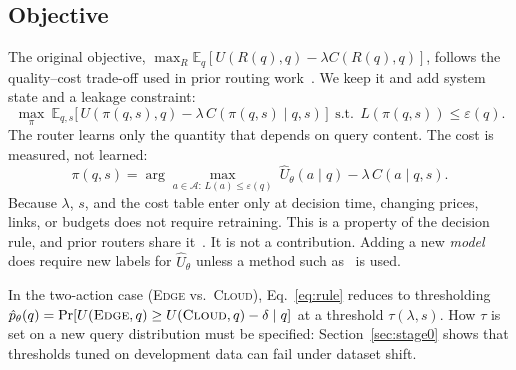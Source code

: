 \documentclass[lettersize,journal]{IEEEtran}
\newcommand{\A}{\mathcal{A}}
\begin{document}
\subsection{Objective}
The original objective, $\max_R \mathbb{E}_q[U(R(q),q)-\lambda C(R(q),q)]$,
follows the quality--cost trade-off used in prior routing
work~\cite{ding2024hybrid,ong2025routellm,song2025irt,ding2025best}. We keep it
and add system state and a leakage constraint:
\begin{equation}
\max_{\pi}\ \mathbb{E}_{q,s}\big[\,U(\pi(q,s),q) - \lambda\, C(\pi(q,s)\mid q,s)\,\big]
\ \ \text{s.t.}\ \ L(\pi(q,s)) \le \varepsilon(q).
\label{eq:objective}
\end{equation}
The router learns only the quantity that depends on query content. The cost is
measured, not learned:
\begin{equation}
\pi(q,s) = \arg\max_{a\in\A:\,L(a)\le\varepsilon(q)} \ \hat U_\theta(a\mid q) - \lambda\, C(a\mid q,s).
\label{eq:rule}
\end{equation}
Because $\lambda$, $s$, and the cost table enter only at decision time,
changing prices, links, or budgets does not require retraining. This is a
property of the decision rule, and prior routers share
it~\cite{ong2025routellm,ding2024hybrid}. It is not a contribution. Adding a new
\emph{model} does require new labels for $\hat U_\theta$ unless a method such
as~\cite{wang2026icl} is used.

In the two-action case (\textsc{Edge} vs.\ \textsc{Cloud}), Eq.~\eqref{eq:rule}
reduces to thresholding $\hat p_\theta(q)=\Pr[U(\textsc{Edge},q)\ge U(\textsc{Cloud},q)-\delta\mid q]$
at a threshold $\tau(\lambda,s)$. How $\tau$ is set on a new query distribution
must be specified: Section~\ref{sec:stage0} shows that thresholds tuned on
development data can fail under dataset shift.
\end{document}

